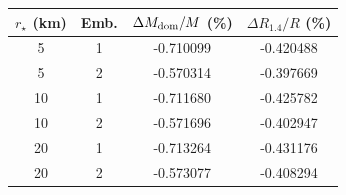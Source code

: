 \begin{tabular}{cccc}
\hline\hline
$r_\star$ (km) & Emb. & $\Delta M_{\rm dom}/M$ (\%) & $\Delta R_{1.4}/R$ (\%) \\
\hline
5 & 1 & -0.710099 & -0.420488 \\
5 & 2 & -0.570314 & -0.397669 \\
10 & 1 & -0.711680 & -0.425782 \\
10 & 2 & -0.571696 & -0.402947 \\
20 & 1 & -0.713264 & -0.431176 \\
20 & 2 & -0.573077 & -0.408294 \\
\hline\hline
\end{tabular}
